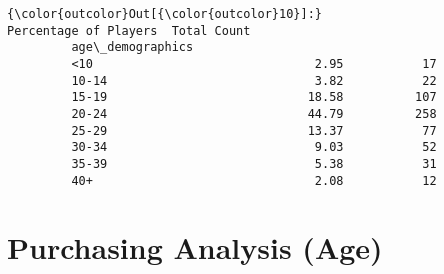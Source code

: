 \documentclass[11pt]{article}
\begin{document}
\begin{Verbatim}[commandchars=\\\{\}]
{\color{outcolor}Out[{\color{outcolor}10}]:}                  Percentage of Players  Total Count
         age\_demographics                                   
         <10                               2.95           17
         10-14                             3.82           22
         15-19                            18.58          107
         20-24                            44.79          258
         25-29                            13.37           77
         30-34                             9.03           52
         35-39                             5.38           31
         40+                               2.08           12
\end{Verbatim}
            
    \section{Purchasing Analysis (Age)}\label{purchasing-analysis-age}
\end{document}
